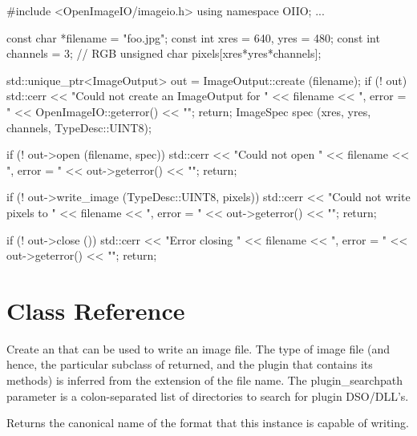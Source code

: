 \begin{code}
        #include <OpenImageIO/imageio.h>
        using namespace OIIO;
        ...

        const char *filename = "foo.jpg";
        const int xres = 640, yres = 480;
        const int channels = 3;  // RGB
        unsigned char pixels[xres*yres*channels];

        std::unique_ptr<ImageOutput> out = ImageOutput::create (filename);
        if (! out) {
            std::cerr << "Could not create an ImageOutput for " 
                      << filename << ", error = " 
                      << OpenImageIO::geterror() << "\n";
            return;
        }
        ImageSpec spec (xres, yres, channels, TypeDesc::UINT8);

        if (! out->open (filename, spec)) {
            std::cerr << "Could not open " << filename 
                      << ", error = " << out->geterror() << "\n";
            return;
        }

        if (! out->write_image (TypeDesc::UINT8, pixels)) {
            std::cerr << "Could not write pixels to " << filename 
                      << ", error = " << out->geterror() << "\n";
            return;
        }

        if (! out->close ()) {
            std::cerr << "Error closing " << filename 
                      << ", error = " << out->geterror() << "\n";
            return;
        }
\end{code}



\section{\ImageOutput Class Reference}
\label{sec:imageoutput:reference}


Create an \ImageOutput that can be used to write an image file.  The
type of image file (and hence, the particular subclass of \ImageOutput
returned, and the plugin that contains its methods) is inferred from the
extension of the file name.  The {\kw plugin_searchpath} parameter is a
colon-separated list of directories to search for \product plugin
DSO/DLL's.
\apiend

Returns the canonical name of the format that this \ImageOutput
instance is capable of writing.
\apiend

